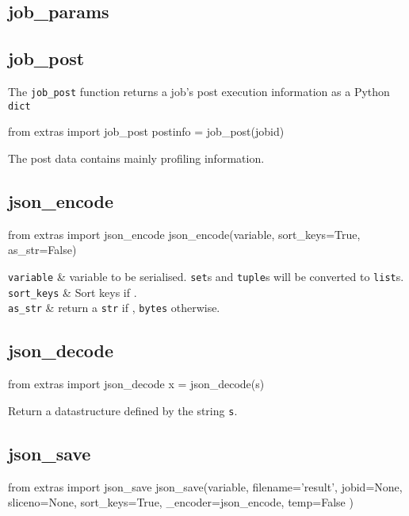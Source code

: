 \subsection{job\_params}



\subsection{job\_post}
The \texttt{job\_post} function returns a job's post execution
information as a Python \texttt{dict}
\begin{python}
from extras import job_post
postinfo = job_post(jobid)
\end{python}
The post data contains mainly profiling information.



\subsection{json\_encode}
\begin{python}
from extras import json_encode
json_encode(variable, sort_keys=True, as_str=False)
\end{python}

\starttabletwo
\RPtwo \texttt{variable} & variable to be serialised.  \texttt{set}s and
\texttt{tuple}s will be converted to \texttt{list}s.\\[1ex]

\RPtwo \texttt{sort\_keys} & Sort keys if \pyTrue.\\[1ex]

\RPtwo \texttt{as\_str} & return a \texttt{str} if \pyTrue, \texttt{bytes}
otherwise.
\stoptabletwo



\subsection{json\_decode}
\begin{python}
from extras import json_decode
x = json_decode(s)
\end{python}
Return a datastructure defined by the string \texttt{s}.




\subsection{json\_save}
\begin{python}
from extras import json_save
json_save(variable,
    filename='result',
    jobid=None,
    sliceno=None,
    sort_keys=True,
    _encoder=json_encode,
    temp=False
)
\end{python}




